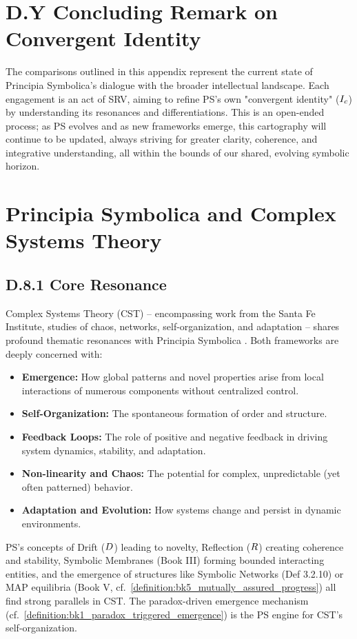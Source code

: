\section*{D.Y Concluding Remark on Convergent Identity} \label{sec:appD_concluding_remark_convergent_identity}
The comparisons outlined in this appendix represent the current state of Principia Symbolica's dialogue with the broader intellectual landscape. Each engagement is an act of SRV, aiming to refine PS's own "convergent identity" (\(I_c\)) by understanding its resonances and differentiations. This is an open-ended process; as PS evolves and as new frameworks emerge, this cartography will continue to be updated, always striving for greater clarity, coherence, and integrative understanding, all within the bounds of our shared, evolving symbolic horizon.
\section*{Principia Symbolica and Complex Systems Theory} \label{sec:appD_ps_and_complex_systems_theory}
\subsection*{D.8.1 Core Resonance}
\label{subsec:appD_cst_core_resonance}
Complex Systems Theory (CST) – encompassing work from the Santa Fe Institute, studies of chaos, networks, self-organization, and adaptation – shares profound thematic resonances with Principia Symbolica \cite{mitchell2009}. Both frameworks are deeply concerned with:
\begin{itemize}
    \item \textbf{Emergence:} How global patterns and novel properties arise from local interactions of numerous components without centralized control.
    \item \textbf{Self-Organization:} The spontaneous formation of order and structure.
    \item \textbf{Feedback Loops:} The role of positive and negative feedback in driving system dynamics, stability, and adaptation.
    \item \textbf{Non-linearity and Chaos:} The potential for complex, unpredictable (yet often patterned) behavior.
    \item \textbf{Adaptation and Evolution:} How systems change and persist in dynamic environments.
\end{itemize}
PS's concepts of Drift (\(D\)) leading to novelty, Reflection (\(R\)) creating coherence and stability, Symbolic Membranes (Book III) forming bounded interacting entities, and the emergence of structures like Symbolic Networks (Def 3.2.10) or MAP equilibria (Book V, cf.~\ref{definition:bk5_mutually_assured_progress}) all find strong parallels in CST. The paradox-driven emergence mechanism (cf.~\ref{definition:bk1_paradox_triggered_emergence}) is the PS engine for CST's self-organization.
